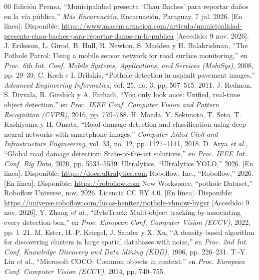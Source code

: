 \documentclass[conference]{IEEEtran}
\begin{document}
\begin{thebibliography}{00}
 Edición Prensa, ``Municipalidad presenta `Chau Baches' para reportar daños en la vía pública,'' \emph{Más Encarnación}, Encarnación, Paraguay, 7 jul. 2026. [En línea]. Disponible: \url{https://www.masencarnacion.com/articulo/municipalidad-presenta-chau-baches-para-reportar-danos-en-la-publica} [Accedido: 9 nov. 2026].
 J. Eriksson, L. Girod, B. Hull, R. Newton, S. Madden y H. Balakrishnan, ``The Pothole Patrol: Using a mobile sensor network for road surface monitoring,'' en \emph{Proc. 6th Int. Conf. Mobile Systems, Applications, and Services (MobiSys)}, 2008, pp. 29--39.
 C. Koch e I. Brilakis, ``Pothole detection in asphalt pavement images,'' \emph{Advanced Engineering Informatics}, vol. 25, no. 3, pp. 507--515, 2011.
 J. Redmon, S. Divvala, R. Girshick y A. Farhadi, ``You only look once: Unified, real-time object detection,'' en \emph{Proc. IEEE Conf. Computer Vision and Pattern Recognition (CVPR)}, 2016, pp. 779--788.
 H. Maeda, Y. Sekimoto, T. Seto, T. Kashiyama y H. Omata, ``Road damage detection and classification using deep neural networks with smartphone images,'' \emph{Computer-Aided Civil and Infrastructure Engineering}, vol. 33, no. 12, pp. 1127--1141, 2018.
 D. Arya \emph{et al.}, ``Global road damage detection: State-of-the-art solutions,'' en \emph{Proc. IEEE Int. Conf. Big Data}, 2020, pp. 5533--5539.
 Ultralytics, ``Ultralytics YOLO,'' 2026. [En línea]. Disponible: \url{https://docs.ultralytics.com}
 Roboflow, Inc., ``Roboflow,'' 2026. [En línea]. Disponible: \url{https://roboflow.com}
 New Workspace, ``pothole Dataset,'' Roboflow Universe, nov. 2026. Licencia CC BY 4.0. [En línea]. Disponible: \url{https://universe.roboflow.com/lucas-benitez/pothole-vhmow-bygvr} [Accedido: 9 nov. 2026].
 Y. Zhang \emph{et al.}, ``ByteTrack: Multi-object tracking by associating every detection box,'' en \emph{Proc. European Conf. Computer Vision (ECCV)}, 2022, pp. 1--21.
 M. Ester, H.-P. Kriegel, J. Sander y X. Xu, ``A density-based algorithm for discovering clusters in large spatial databases with noise,'' en \emph{Proc. 2nd Int. Conf. Knowledge Discovery and Data Mining (KDD)}, 1996, pp. 226--231.
 T.-Y. Lin \emph{et al.}, ``Microsoft COCO: Common objects in context,'' en \emph{Proc. European Conf. Computer Vision (ECCV)}, 2014, pp. 740--755.
\end{thebibliography}
\end{document}
